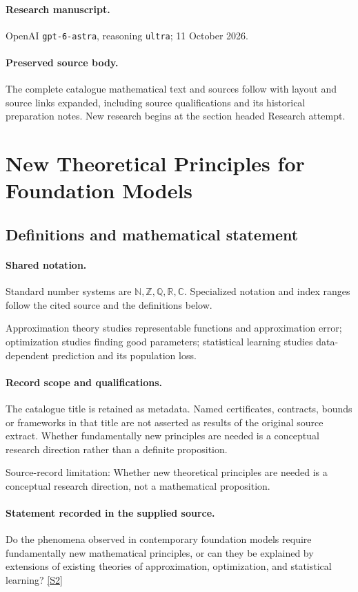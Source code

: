 \documentclass[11pt]{article}
\begin{document}
\paragraph{Research manuscript.} OpenAI \texttt{gpt-6-astra}, reasoning \texttt{ultra}; 11 October 2026.
\paragraph{Preserved source body.} The complete catalogue mathematical text and sources follow with layout and source links expanded, including source qualifications and its historical preparation notes. New research begins at the section headed Research attempt.

\section{New Theoretical Principles for Foundation Models}\label{statement}

\subsection{Definitions and mathematical statement}

\paragraph{Shared notation.}Standard number systems are $\mathbb N,\mathbb Z,\mathbb Q,\mathbb R,\mathbb C$. Specialized notation and index ranges follow the cited source and the definitions below.


Approximation theory studies representable functions and approximation error; optimization studies finding good parameters; statistical learning studies data-dependent prediction and its population loss.
\paragraph{Record scope and qualifications.}
The catalogue title is retained as metadata. Named certificates, contracts, bounds or frameworks in that title are not asserted as results of the original source extract.
Whether fundamentally new principles are needed is a conceptual research direction rather than a definite proposition.

Source-record limitation: Whether new theoretical principles are needed is a conceptual research direction, not a mathematical proposition.
\paragraph{Statement recorded in the supplied source.}
Do the phenomena observed in contemporary foundation models require fundamentally new mathematical principles, or can they be explained by extensions of existing theories of approximation, optimization, and statistical learning? \href{https://doi.org/10.4171/owr/2026/11}{[S2]}
\end{document}
